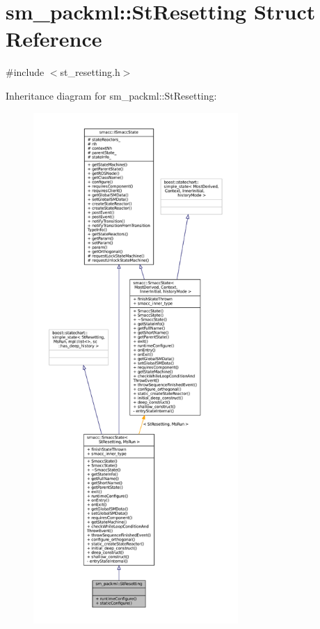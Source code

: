 \hypertarget{structsm__packml_1_1StResetting}{}\section{sm\+\_\+packml\+:\+:St\+Resetting Struct Reference}
\label{structsm__packml_1_1StResetting}


{\ttfamily \#include $<$st\+\_\+resetting.\+h$>$}



Inheritance diagram for sm\+\_\+packml\+:\+:St\+Resetting\+:
\nopagebreak
\begin{figure}[H]
\begin{center}
\leavevmode
\includegraphics[height=550pt]{structsm__packml_1_1StResetting__inherit__graph}
\end{center}
\end{figure}


